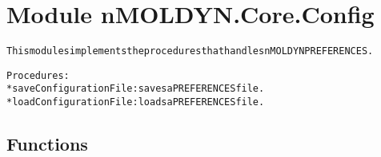 %
%
%


\section{Module nMOLDYN.Core.Config}

    \label{nMOLDYN:Core:Config}
\begin{alltt}

This modules implements the procedures that handles nMOLDYN PREFERENCES.

Procedures:
    * saveConfigurationFile: saves a PREFERENCES file.
    * loadConfigurationFile: loads a PREFERENCES file.
\end{alltt}



  \subsection{Functions}

    \label{nMOLDYN:Core:Config:saveConfigurationFile}

    \vspace{0.5ex}

